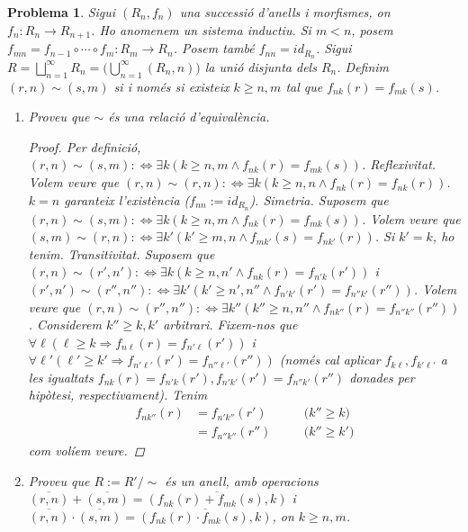 \documentclass[compress]{article}
\newtheorem{problema}{Problema}
\theoremstyle{definition}
\begin{document}
\pagestyle{fancy}
\begin{problema}
    Sigui $(R_{n},f_{n})$ una successió d'anells i morfismes, on $f_{n}:R_{n}\rightarrow R_{n+1}$. Ho anomenem un sistema inductiu. Si $m<n$, posem $f_{mn}=f_{n-1}\circ\cdots\circ f_{m}:R_{m}\rightarrow R_{n}$. Posem també $f_{nn}=id_{R_{n}}$. Sigui $R=\bigsqcup_{n=1}^{\infty}R_{n}=\big(\bigcup_{n=1}^{\infty}(R_{n},n)\big)$ la unió disjunta dels $R_{n}$. Definim $(r,n)\sim(s,m)$ si i només si existeix $k\geq n,m$ tal que $f_{nk}(r)=f_{mk}(s)$.
    \begin{enumerate}
        \item Proveu que $\sim$ és una relació d'equivalència.
        \begin{proof}
            Per definició, $(r,n)\sim(s,m):\iff\exists k(k\geq n,m\land f_{nk}(r)=f_{mk}(s))$.\newline
            Reflexivitat. Volem veure que $(r,n)\sim(r,n):\iff\exists k(k\geq n,n\land f_{nk}(r)=f_{nk}(r))$. $k=n$ garanteix l'existència ($f_{nn}:=id_{R_{n}}$).\newline
            Simetria. Suposem que $(r,n)\sim(s,m):\iff\exists k(k\geq n,m\land f_{nk}(r)=f_{mk}(s))$. Volem veure que $(s,m)\sim(r,n):\iff\exists k'(k'\geq m,n\land f_{mk'}(s)=f_{nk'}(r))$. Si $k'=k$, ho tenim.\newline
            Transitivitat. Suposem que $(r,n)\sim(r',n'):\iff\exists k(k\geq n,n'\land f_{nk}(r)=f_{n'k}(r'))$ i $(r',n')\sim(r'',n''):\iff\exists k'(k'\geq n',n''\land f_{n'k'}(r')=f_{n''k'}(r''))$. Volem veure que $(r,n)\sim(r'',n''):\iff\exists k''(k''\geq n,n''\land f_{nk''}(r)=f_{n''k''}(r''))$. Considerem $k''\geq k,k'$ arbitrari. Fixem-nos que $\forall\ell(\ell\geq k\Rightarrow f_{n\ell}(r)=f_{n'\ell}(r'))$ i $\forall\ell'(\ell'\geq k'\Rightarrow f_{n'\ell'}(r')=f_{n''\ell'}(r''))$ (només cal aplicar $f_{k\ell},f_{k'\ell'}$ a les igualtats $f_{nk}(r)=f_{n'k}(r'),f_{n'k'}(r')=f_{n''k'}(r'')$ donades per hipòtesi, respectivament). Tenim
            \begin{align*}
                f_{nk''}(r)
                &=f_{n'k''}(r')
                &\quad&\textrm{($k''\geq k$)}\\
                &=f_{n''k''}(r'')
                &\quad&\textrm{($k''\geq k'$)}
            \end{align*}
            com volíem veure.
        \end{proof}
        \item Proveu que $R:=R'/\sim$ és un anell, amb operacions $\overline{(r,n)}+\overline{(s,m)}=\overline{(f_{nk}(r)+f_{mk}(s),k)}$ i $\overline{(r,n)}\cdot\overline{(s,m)}=\overline{(f_{nk}(r)\cdot f_{mk}(s),k)}$, on $k\geq n,m$.

\end{enumerate}
\end{problema}
\end{document}
